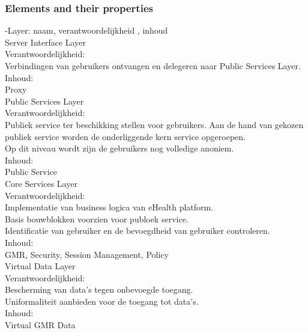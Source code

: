 \documentclass[a4paper,10pt]{article}
\begin{document}
\subsubsection{Elements and their properties}

-Layer: naam, verantwoordelijkheid , inhoud\\

Server Interface Layer\\

Verantwoordelijkheid:\\
Verbindingen van gebruikers ontvangen en delegeren naar Public Services Layer.\\

Inhoud:\\
Proxy\\

Public Services Layer\\

Verantwoordelijkheid:\\
Publiek service ter beschikking stellen voor gebruikers. Aan de hand van gekozen publiek service worden de onderliggende kern service opgeroepen.\\
Op dit niveau wordt zijn de gebruikers nog volledige anoniem.\\

Inhoud:\\
Public Service\\

Core Services Layer\\

Verantwoordelijkheid:\\
Implementatie van business logica van eHealth platform.\\
Basis bouwblokken voorzien voor publoek service.\\
Identificatie van gebruiker en de bevoegdheid van gebruiker controleren.\\

Inhoud:\\
GMR, Security, Session Management, Policy\\

Virtual Data Layer\\

Verantwoordelijkheid:\\
Bescherming van data's tegen onbevoegde toegang.\\
Uniformaliteit aanbieden voor de toegang tot data's.\\

Inhoud:\\
Virtual GMR Data\\
\end{document}
